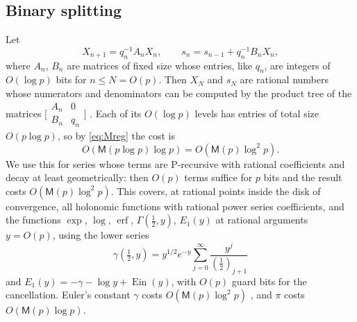 \documentclass[11pt,reqno]{amsart}
\theoremstyle{definition}
\theoremstyle{remark}
\newcommand{\Ein}{\operatorname{Ein}}
\newcommand{\erf}{\operatorname{erf}}
\newcommand{\Mul}{\mathsf{M}}
\begin{document}
\subsection{Binary splitting}\label{sec:bsplit}
Let
\[
  X_{n+1} = q_n^{-1} A_n X_n, \qquad s_{n} = s_{n-1} + q_n^{-1} B_n X_n,
\]
where $A_n$, $B_n$ are matrices of fixed size whose entries, like $q_n$, are integers of $O(\log p)$ bits for
$n \le N = O(p)$. Then $X_N$ and $s_N$ are rational numbers whose numerators and denominators can be computed by
the product tree of the matrices $\bigl[\begin{smallmatrix} A_n & 0 \\ B_n & q_n\end{smallmatrix}\bigr]$
\cite{HP98}. Each of its $O(\log p)$ levels has entries of total size $O(p\log p)$, so by \eqref{eq:Mreg} the cost is
\[
  O(\Mul(p\log p)\log p) = O(\Mul(p)\log^2 p).
\] We
use this for series whose terms are P-recursive with rational coefficients and decay at least
geometrically: then $O(p)$ terms suffice for $p$ bits and the result costs $O(\Mul(p) \log^2 p)$.
This covers, at rational points inside the disk of convergence, all holonomic functions with rational
power series coefficients, and the functions $\exp$, $\log$, $\erf$, $\Gamma(\frac12, y)$, $E_1(y)$
at rational arguments $y = O(p)$, using the lower series
\[
  \gamma(\tfrac12,y) = y^{1/2}e^{-y}\sum_{j=0}^{\infty} \frac{y^j}{(\frac12)_{j+1}}
\]
and $E_1(y) = -\gamma - \log y + \Ein(y)$, with $O(p)$ guard bits for the cancellation. Euler's constant $\gamma$
costs $O(\Mul(p)\log^2p)$ \cite{BM80}, and $\pi$ costs $O(\Mul(p)\log p)$.
\end{document}

